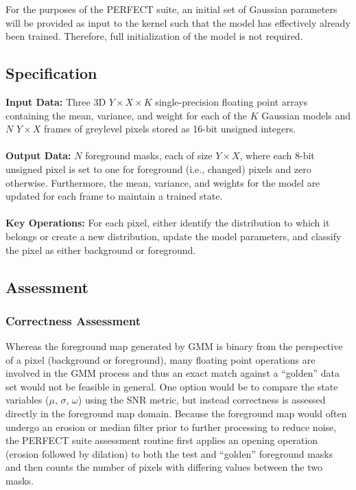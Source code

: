 \documentclass{report}
\begin{document}
For the purposes of the PERFECT suite, an initial set of Gaussian parameters
will be provided as input to the kernel such that the model has effectively
already been trained.
Therefore, full initialization of the model is not required.

\subsection{Specification}
\label{sec:wami:change_detection:spec}

\textbf{Input Data:} Three 3D $Y \times X \times K$ single-precision floating point
arrays containing the mean, variance, and weight for each of the $K$ Gaussian models
and $N$ $Y \times X$ frames of greylevel pixels stored as 16-bit unsigned integers. \\ \\
\textbf{Output Data:} 
$N$ foreground masks, each of size $Y \times X$, where each 8-bit unsigned pixel
is set to one for foreground (i.e., changed) pixels and zero otherwise.
Furthermore, the mean, variance, and weights for the model are updated for each
frame to maintain a trained state. \\ \\
\textbf{Key Operations:} For each pixel, either identify the distribution to which
it belongs or create a new distribution, update the model parameters, and classify
the pixel as either background or foreground.

\subsection{Assessment}

\subsubsection{Correctness Assessment}
\label{sec:wami:change_detection:correctness}

Whereas the foreground map generated by GMM is binary from the perspective of a pixel
(background or foreground), many floating point operations are involved in the GMM
process and thus an exact match against a ``golden'' data set would not be feasible
in general.
One option would be to compare the state variables ($\mu$, $\sigma$, $\omega$) using
the SNR metric, but instead correctness is assessed directly in the foreground
map domain.
Because the foreground map would often undergo an erosion or median filter prior
to further processing to reduce noise, the PERFECT suite assessment routine
first applies an opening operation (erosion followed by dilation) to both the
test and ``golden'' foreground masks and then counts the number of pixels
with differing values between the two masks.
\end{document}
